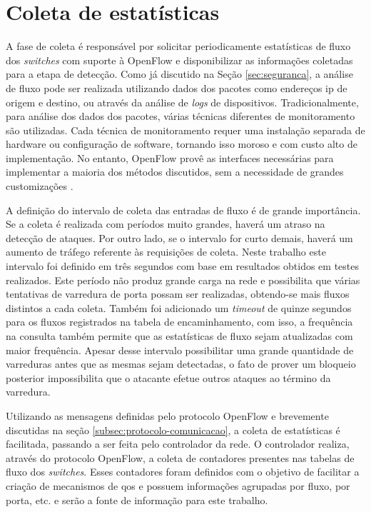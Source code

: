 \section{Coleta de estatísticas}
\label{sec:coleta}

A fase de coleta é responsável por solicitar periodicamente estatísticas de fluxo dos \textit{switches} com suporte à OpenFlow e disponibilizar as informações coletadas para a etapa de detecção. Como já discutido na Seção \ref{sec:seguranca}, a análise de fluxo pode ser realizada utilizando dados dos pacotes como endereços \gls{ip} de origem e destino, ou através da análise de \textit{logs} de dispositivos. Tradicionalmente, para análise dos dados dos pacotes, várias técnicas diferentes de monitoramento são utilizadas. Cada técnica de monitoramento requer uma instalação separada de hardware ou configuração de software, tornando isso moroso e com custo alto de implementação. No entanto, OpenFlow  provê as interfaces necessárias para implementar a maioria dos métodos discutidos, sem a necessidade de grandes customizações \cite{Adrichem:2014}.

A definição do intervalo de coleta das entradas de fluxo é de grande importância. Se a coleta é realizada com períodos muito grandes, haverá um atraso na detecção de ataques. Por outro lado, se o intervalo for curto demais, haverá um aumento de tráfego referente às requisições de coleta. Neste trabalho este intervalo foi definido em três segundos com base em resultados obtidos em testes realizados. Este período não produz grande carga na rede e possibilita que várias tentativas de varredura de porta possam ser realizadas, obtendo-se mais fluxos distintos a cada coleta. Também foi adicionado um \textit{timeout} de quinze segundos para os fluxos registrados na tabela de encaminhamento, com isso, a frequência na consulta também permite que as estatísticas de fluxo sejam atualizadas com maior frequência. Apesar desse intervalo possibilitar uma grande quantidade de varreduras antes que as mesmas sejam detectadas, o fato de prover um bloqueio posterior impossibilita que o atacante efetue outros ataques ao término da varredura.

Utilizando as mensagens definidas pelo protocolo OpenFlow e brevemente discutidas na seção \ref{subsec:protocolo-comunicacao}, a coleta de estatísticas é facilitada, passando a ser feita pelo controlador da rede. O controlador realiza, através do protocolo OpenFlow, a coleta de contadores presentes nas tabelas de fluxo dos \textit{switches}. Esses contadores foram definidos com o objetivo de facilitar a criação de mecanismos de \gls{qos} \cite{website:onf} e possuem informações agrupadas por fluxo, por porta, etc. e serão a fonte de informação para este trabalho.

